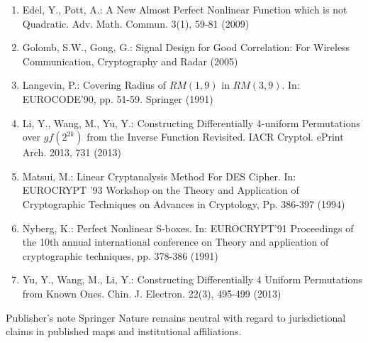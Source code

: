 \documentclass[10pt]{article}
\begin{document}
\begin{enumerate}
  \item Edel, Y., Pott, A.: A New Almost Perfect Nonlinear Function which is not Quadratic. Adv. Math. Commun. 3(1), 59-81 (2009)
  \item Golomb, S.W., Gong, G.: Signal Design for Good Correlation: For Wireless Communication, Cryptography and Radar (2005)
  \item Langevin, P.: Covering Radius of $R M(1,9)$ in $R M(3,9)$. In: EUROCODE'90, pp. 51-59. Springer (1991)
  \item Li, Y., Wang, M., Yu, Y.: Constructing Differentially 4-uniform Permutations over $g f\left(2^{2 k}\right)$ from the Inverse Function Revisited. IACR Cryptol. ePrint Arch. 2013, 731 (2013)
  \item Matsui, M.: Linear Cryptanalysis Method For DES Cipher. In: EUROCRYPT '93 Workshop on the Theory and Application of Cryptographic Techniques on Advances in Cryptology, Pp. 386-397 (1994)
  \item Nyberg, K.: Perfect Nonlinear S-boxes. In: EUROCRYPT'91 Proceedings of the 10th annual international conference on Theory and application of cryptographic techniques, pp. 378-386 (1991)
  \item Yu, Y., Wang, M., Li, Y.: Constructing Differentially 4 Uniform Permutations from Known Ones. Chin. J. Electron. 22(3), 495-499 (2013)
\end{enumerate}

Publisher's note Springer Nature remains neutral with regard to jurisdictional claims in published maps and institutional affiliations.
\end{document}
